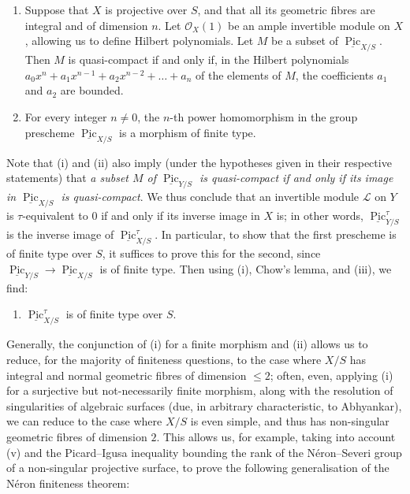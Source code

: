 \begin{remark}{}
\begin{enumerate}
      
 \item[iii.]
        Suppose that \(X\) is projective over \(S\), and that all its geometric fibres are integral and of dimension \(n\).
        Let \(\mathcal {O}_X(1)\) be an ample invertible module on \(X\), allowing us to define Hilbert polynomials.
        Let \(M\) be a subset of \(\underline {\operatorname {Pic}}_{X/S}\).
        Then \(M\) is quasi-compact if and only if, in the Hilbert polynomials \(a_0x^n+a_1x^{n-1}+a_2x^{n-2}+\ldots +a_n\) of the elements of \(M\), the coefficients \(a_1\) and \(a_2\) are bounded.
      


      
 \item[iv.]
        For every integer \(n\neq 0\), the \(n\)-th power homomorphism in the group prescheme \(\underline {\operatorname {Pic}}_{X/S}\) is a morphism of finite type.
      

    \end{enumerate}\par{}Note that (i) and (ii) also imply (under the hypotheses given in their respective statements) that \emph{a subset \(M\) of \(\underline {\operatorname {Pic}}_{Y/S}\) is quasi-compact if and only if its image in \(\underline {\operatorname {Pic}}_{X/S}\) is quasi-compact}.
    We thus conclude that an invertible module \(\mathscr {L}\) on \(Y\) is \(\tau \)-equivalent to \(0\) if and only if its inverse image in \(X\) is;
    in other words, \(\underline {\operatorname {Pic}}_{Y/S}^\tau \) is the inverse image of \(\underline {\operatorname {Pic}}_{X/S}^\tau \).
    In particular, to show that the first prescheme is of finite type over \(S\), it suffices to prove this for the second, since \(\underline {\operatorname {Pic}}_{Y/S}\to \underline {\operatorname {Pic}}_{X/S}\) is of finite type.
    Then using (i), Chow's lemma, and (iii), we find:

    
 \begin{enumerate}
      
 \item[v.]
        \(\underline {\operatorname {Pic}}_{X/S}^\tau \) is of finite type over \(S\).
      

    \end{enumerate}\par{}Generally, the conjunction of (i) for a finite morphism and (ii) allows us to reduce, for the majority of finiteness questions, to the case where \(X/S\) has integral and normal geometric fibres of dimension \(\leqslant 2\);
    often, even, applying (i) for a surjective but not-necessarily finite morphism, along with the resolution of singularities of algebraic surfaces (due, in arbitrary characteristic, to Abhyankar), we can reduce to the case where \(X/S\) is even simple, and thus has non-singular geometric fibres of dimension \(2\).
    This allows us, for example, taking into account (v) and the Picard–Igusa inequality bounding the rank of the Néron–Severi group of a non-singular projective surface, to prove the following generalisation of the Néron finiteness theorem:


\end{remark}
